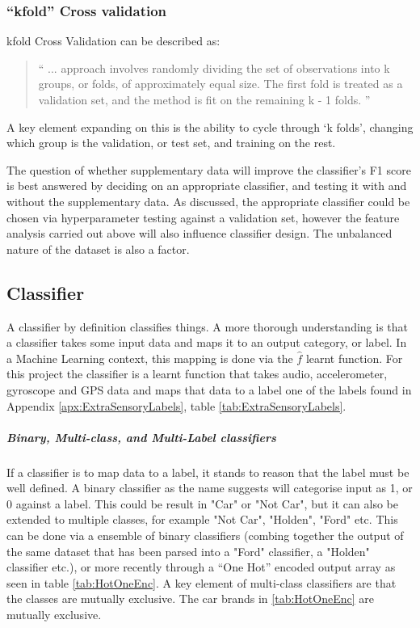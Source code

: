\documentclass{UoNMCHA}
\newcommand{\inlineQuote}[1]{``#1''}
\newcommand{\fancyquote}[1]{\begin{quotation}\inlineQuote{#1}\end{quotation}}
\numberwithin{equation}{section}
\begin{document}
\subsubsection{\inlineQuote{kfold} Cross validation}
kfold Cross Validation can be described as:
\fancyquote{
    ... approach involves randomly dividing the set of observations into k groups, or folds, of approximately equal size. The first fold is treated as a validation set, and the method is fit on the remaining k - 1 folds. 
    }\cite{James2017}
A key element expanding on this is the ability to cycle through `k folds', changing which group is the validation, or test set, and training on the rest.

The question of whether supplementary data will improve the classifier's F1 score is best answered by deciding on an appropriate classifier, and testing it with and without the supplementary data. As discussed, the appropriate classifier could be chosen via hyperparameter testing against a validation set, however the feature analysis carried out above will also influence classifier design. The unbalanced nature of the dataset is also a factor.


\subsection{Classifier}

A classifier by definition classifies things. A more thorough understanding is that a classifier takes some input data and maps it to an output category, or label. In a Machine Learning context, this mapping is done via the $\hat{f}$ learnt function. For this project the classifier is a learnt function that takes audio, accelerometer, gyroscope and GPS data and maps that data to a label one of the labels found in Appendix \ref{apx:ExtraSensoryLabels}, table \ref{tab:ExtraSensoryLabels}. 

\subparagraph{Binary, Multi-class, and  Multi-Label classifiers}
If a classifier is to map data to a label, it stands to reason that the label must be well defined. A binary classifier as the name suggests will categorise input as 1, or 0 against a label. This could be result in "Car" or "Not Car", but it can also be extended to multiple classes, for example "Not Car", "Holden", "Ford" etc. This can be done via a ensemble of binary classifiers (combing together the output of the same dataset that has been parsed into a "Ford" classifier, a "Holden" classifier etc.), or more recently through a \inlineQuote{One Hot}\cite{huffman1954the} encoded output array as seen in table \ref{tab:HotOneEnc}. A key element of multi-class classifiers are that the classes are mutually exclusive. The car brands in \ref{tab:HotOneEnc} are mutually exclusive.
\end{document}
